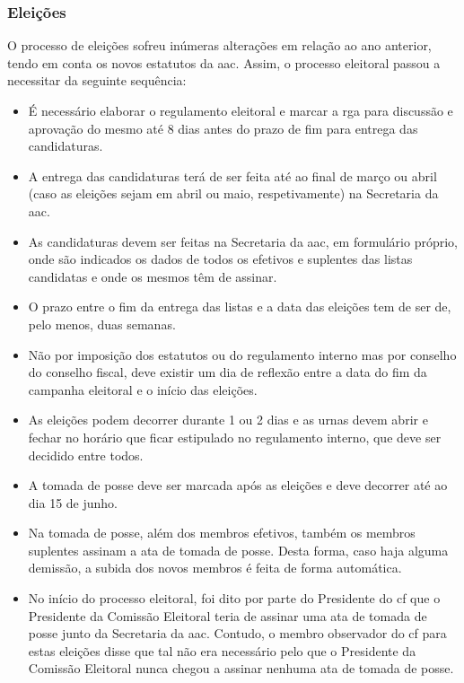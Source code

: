 
\subsubsection{Eleições}

O processo de eleições sofreu inúmeras alterações em relação ao ano anterior, tendo em conta os novos estatutos da \acrshort{aac}. Assim, o processo eleitoral passou a necessitar da seguinte sequência:
\begin{itemize}
\item É necessário elaborar o regulamento eleitoral e marcar a \acrshort{rga} para discussão e aprovação do mesmo até 8 dias antes do prazo de fim para entrega das candidaturas.
\item A entrega das candidaturas terá de ser feita até ao final de março ou abril (caso as eleições sejam em abril ou maio, respetivamente) na Secretaria da \acrshort{aac}.
\item As candidaturas devem ser feitas na Secretaria da \acrshort{aac}, em formulário próprio, onde são indicados os dados de todos os efetivos e suplentes das listas candidatas e onde os mesmos têm de assinar.
\item O prazo entre o fim da entrega das listas e a data das eleições tem de ser de, pelo menos, duas semanas.
\item Não por imposição dos estatutos ou do regulamento interno mas por conselho do conselho fiscal, deve existir um dia de reflexão entre a data do fim da campanha eleitoral e o início das eleições.
\item As eleições podem decorrer durante 1 ou 2 dias e as urnas devem abrir e fechar no horário que ficar estipulado no regulamento interno, que deve ser decidido entre todos.
\item A tomada de posse deve ser marcada após as eleições e deve decorrer até ao dia 15 de junho.
\item Na tomada de posse, além dos membros efetivos, também os membros suplentes assinam a ata de tomada de posse. Desta forma, caso haja alguma demissão, a subida dos novos membros é feita de forma automática.
\item No início do processo eleitoral, foi dito por parte do Presidente do \acrshort{cf} que o Presidente da Comissão Eleitoral teria de assinar uma ata de tomada de posse junto da Secretaria da \acrshort{aac}. Contudo, o membro observador do \acrshort{cf} para estas eleições disse que tal não era necessário pelo que o Presidente da Comissão Eleitoral nunca chegou a assinar nenhuma ata de tomada de posse.
\end{itemize}

